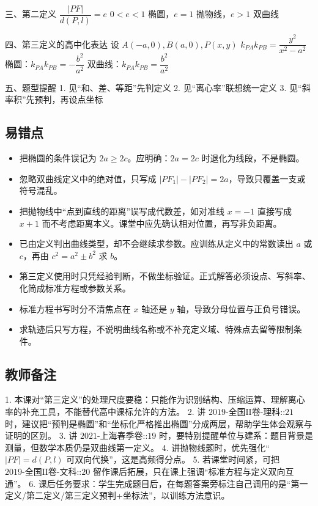 \documentclass[UTF8,a4paper,11pt]{ctexart}
\begin{document}
三、第二定义
$\dfrac{|PF|}{d(P,l)}=e$
$0<e<1$ 椭圆，$e=1$ 抛物线，$e>1$ 双曲线

四、第三定义的高中化表达
设 $A(-a,0),B(a,0),P(x,y)$
$k_{PA}k_{PB}=\dfrac{y^2}{x^2-a^2}$
椭圆：$k_{PA}k_{PB}=-\dfrac{b^2}{a^2}$
双曲线：$k_{PA}k_{PB}=\dfrac{b^2}{a^2}$

五、题型提醒
1. 见“和、差、等距”先判定义
2. 见“离心率”联想统一定义
3. 见“斜率积”先预判，再设点坐标

\subsection*{易错点}

\begin{itemize}

\item 把椭圆的条件误记为 $2a\ge 2c$。应明确：$2a=2c$ 时退化为线段，不是椭圆。

\item 忽略双曲线定义中的绝对值，只写成 $|PF_1|-|PF_2|=2a$，导致只覆盖一支或符号混乱。

\item 把抛物线中“点到直线的距离”误写成代数差，如对准线 $x=-1$ 直接写成 $x+1$ 而不考虑距离本义。课堂中应先确认相对位置，再写非负距离。

\item 已由定义判出曲线类型，却不会继续求参数。应训练从定义中的常数读出 $a$ 或 $c$，再由 $c^2=a^2\pm b^2$ 求 $b$。

\item 第三定义使用时只凭经验判断，不做坐标验证。正式解答必须设点、写斜率、化简成标准方程或参数关系。

\item 标准方程书写时分不清焦点在 $x$ 轴还是 $y$ 轴，导致分母位置与正负号错误。

\item 求轨迹后只写方程，不说明曲线名称或不补充定义域、特殊点去留等限制条件。

\end{itemize}

\subsection*{教师备注}

1. 本课对“第三定义”的处理尺度要稳：只能作为识别结构、压缩运算、理解离心率的补充工具，不能替代高中课标允许的方法。
2. 讲 $\text{2019-全国II卷-理科::21}$ 时，建议把“预判是椭圆”和“坐标化严格推出椭圆”分成两层，帮助学生体会观察与证明的区别。
3. 讲 $\text{2021-上海春季卷::19}$ 时，要特别提醒单位与建系：题目背景是测量，但数学本质仍是双曲线第一定义。
4. 讲抛物线题时，优先强化“$|PF|=d(P,l)$ 可双向代换”，这是高频得分点。
5. 若课堂时间紧，可把 $\text{2019-全国II卷-文科::20}$ 留作课后拓展，只在课上强调“标准方程与定义双向互通”。
6. 课后任务要求：学生完成题目后，在每题答案旁标注自己调用的是“第一定义/第二定义/第三定义预判+坐标法”，以训练方法意识。
\end{document}
